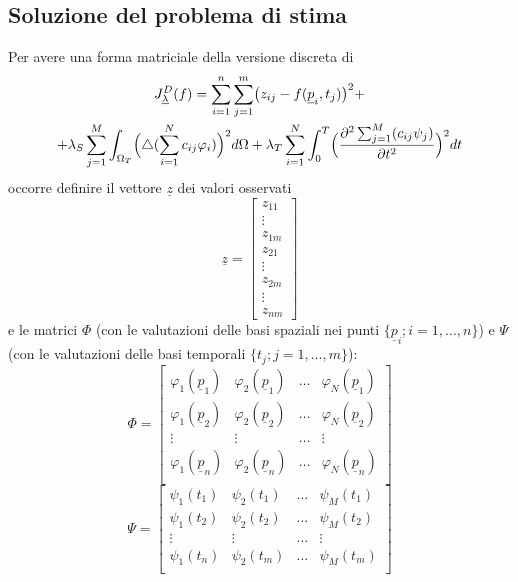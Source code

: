 \documentclass[a4paper,11pt,twoside,openright]{book}							%
\begin{document}
\subsection*{Soluzione del problema di stima}
Per avere una forma matriciale della versione discreta di 
\begin{multline*}
J_{\underline \lambda }^D(f)= \sum_{i=1}^n \sum_{j=1}^m \bigl( z_{ij} - f(\underline p_i,t_j) \bigr)^2 + \\
+ \lambda_S  \sum_{j=1}^M \int_{\Omega_T} \Bigl( \triangle(\sum_{i=1}^N  c_{ij}\varphi_i ) \Bigr)^2 d \Omega + \lambda_T \sum_{i=1}^N\int_0^T \Bigl( \frac{\partial^2 \sum_{j=1}^M(c_{ij}\psi_j) }{\partial t ^2} \Bigr)^2 dt
\end{multline*}
 occorre definire il vettore $\underline z$ dei valori osservati 
\begin{equation}
\underline z =
\begin{bmatrix}
z_{11}  \\
\vdots\\
z_{1m}  \\
z_{21}  \\
\vdots\\
z_{2m}  \\
\vdots\\
z_{nm}
\end{bmatrix}
\end{equation}
e le matrici $\Phi$ (con le valutazioni delle basi spaziali nei punti $\{\underline p_i; i = 1,\ldots,n\}$) e $\Psi$ (con le valutazioni delle basi temporali $\{t_j; j = 1,\ldots,m\}$):
$$
\Phi =
\begin{bmatrix}
\varphi_{1}(\underline p_1) & \varphi_{2}(\underline p_1) & \hdots & \varphi_{N}(\underline p_1)  \\
\varphi_{1}(\underline p_2) & \varphi_{2}(\underline p_2) & \hdots & \varphi_{N}(\underline p_2)  \\
\vdots & \vdots & \hdots & \vdots \\
\varphi_{1}(\underline p_n) & \varphi_{2}(\underline p_n) & \hdots & \varphi_{N}(\underline p_n)  \\
\end{bmatrix}
$$
$$
\Psi = 
\begin{bmatrix}
\psi_{1}( t_1) & \psi_{2}( t_1) & \hdots & \psi_{M}( t_1)  \\
\psi_{1}( t_2) & \psi_{2}( t_2) & \hdots & \psi_{M}( t_2)  \\
\vdots & \vdots & \hdots & \vdots \\
\psi_{1}( t_n) & \psi_{2}( t_m) & \hdots & \psi_{M}( t_m)  \\
\end{bmatrix}
$$
\end{document}
